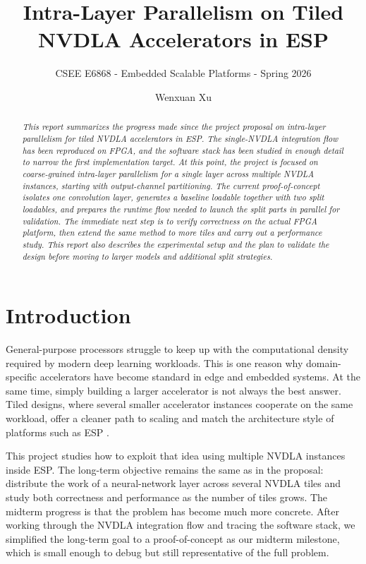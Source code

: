 \documentclass[10pt,sigconf,nonacm]{acmart}
\begin{document}
\title{Intra-Layer Parallelism on Tiled NVDLA Accelerators in ESP}
\subtitle{\normalsize CSEE E6868 - Embedded Scalable Platforms - Spring 2026}

\author{Wenxuan Xu}

\renewcommand{\shortauthors}{W. Xu}

\begin{abstract}
{\small\em
This report summarizes the progress made since the project proposal on intra-layer parallelism for tiled NVDLA accelerators in ESP. The single-NVDLA integration flow has been reproduced on FPGA, and the software stack has been studied in enough detail to narrow the first implementation target. At this point, the project is focused on coarse-grained intra-layer parallelism for a single layer across multiple NVDLA instances, starting with output-channel partitioning. The current proof-of-concept isolates one convolution layer, generates a baseline loadable together with two split loadables, and prepares the runtime flow needed to launch the split parts in parallel for validation. The immediate next step is to verify correctness on the actual FPGA platform, then extend the same method to more tiles and carry out a performance study. This report also describes the experimental setup and the plan to validate the design before moving to larger models and additional split strategies.
}
\end{abstract}

\maketitle

\section{Introduction}
\label{sec:intro}
General-purpose processors struggle to keep up with the computational density required by modern deep learning workloads. This is one reason why domain-specific accelerators have become standard in edge and embedded systems. At the same time, simply building a larger accelerator is not always the best answer. Tiled designs, where several smaller accelerator instances cooperate on the same workload, offer a cleaner path to scaling and match the architecture style of platforms such as ESP \cite{esp_iccad, survey_accel}.

This project studies how to exploit that idea using multiple NVDLA instances inside ESP. The long-term objective remains the same as in the proposal: distribute the work of a neural-network layer across several NVDLA tiles and study both correctness and performance as the number of tiles grows. The midterm progress is that the problem has become much more concrete. After working through the NVDLA integration flow and tracing the software stack, we simplified the long-term goal to a proof-of-concept as our midterm milestone, which is small enough to debug but still representative of the full problem.
\end{document}
